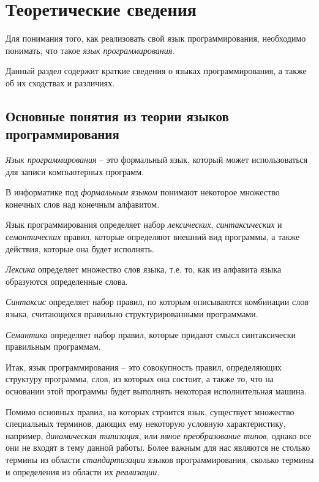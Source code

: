 \section{Теоретические сведения}

Для понимания того, как реализовать свой язык программирования,
необходимо понимать, что такое \emph{язык программирования}.

Данный раздел содержит краткие сведения о языках программирования,
а также об их сходствах и различиях.

\subsection{Основные понятия из теории языков программирования}

\emph{Язык программирования} -- это формальный язык,
который может использоваться для записи компьютерных программ.

В информатике под \emph{формальным языком} понимают некоторое
множество конечных слов над конечным алфавитом.

Язык программирования определяет набор 
\emph{лексических}, \emph{синтаксических} и \emph{семантических} 
правил, которые определяют внешний вид программы, а также действия, 
которые она будет исполнять.

\emph{Лексика} определяет множество слов языка, т.е. то,
как из алфавита языка образуются определенные слова.

\emph{Синтаксис} определяет набор правил, по которым
описываются комбинации слов языка,
считающихся правильно структурированными программами.

\emph{Семантика} определяет набор правил, которые 
придают смысл синтаксически правильным программам.

Итак, язык программирования -- это совокупность правил,
определяющих структуру программы, слов, из которых она состоит,
а также то, что на основании этой программы будет выполнять
некоторая исполнительная машина.

Помимо основных правил, на которых строится язык,
существует множество специальных терминов, дающих ему
некоторую условную характеристику, 
например, \emph{динамическая типизация}, 
или \emph{явное преобразование типов}, однако все они
не входят в тему данной работы. Более важным для нас являются 
не столько термины из области \emph{стандартизации} 
языков программирования, сколько
термины и определения из области их \emph{реализации}.

